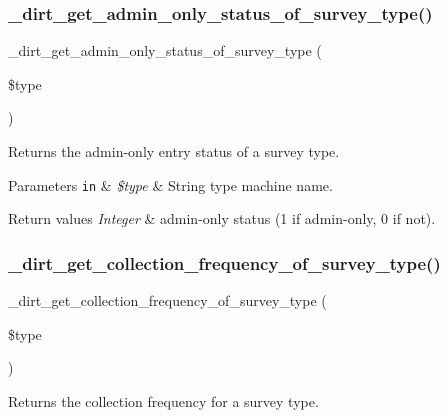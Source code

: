 \subsubsection{\texorpdfstring{\+\_\+dirt\+\_\+get\+\_\+admin\+\_\+only\+\_\+status\+\_\+of\+\_\+survey\+\_\+type()}{\_dirt\_get\_admin\_only\_status\_of\_survey\_type()}}
{\footnotesize\ttfamily \+\_\+dirt\+\_\+get\+\_\+admin\+\_\+only\+\_\+status\+\_\+of\+\_\+survey\+\_\+type (\begin{DoxyParamCaption}\item[{}]{\$type }\end{DoxyParamCaption})}

Returns the admin-\/only entry status of a survey type.


\begin{DoxyParams}[1]{Parameters}
\mbox{\tt in}  & {\em \$type} & String type machine name.\\
\hline
\end{DoxyParams}

\begin{DoxyRetVals}{Return values}
{\em Integer} & admin-\/only status (1 if admin-\/only, 0 if not). \\
\hline
\end{DoxyRetVals}
\mbox{\label{dirt_8survey__types_8inc_ad4046b68c0497c09450d0f6501afdd7e}} 
\subsubsection{\texorpdfstring{\+\_\+dirt\+\_\+get\+\_\+collection\+\_\+frequency\+\_\+of\+\_\+survey\+\_\+type()}{\_dirt\_get\_collection\_frequency\_of\_survey\_type()}}
{\footnotesize\ttfamily \+\_\+dirt\+\_\+get\+\_\+collection\+\_\+frequency\+\_\+of\+\_\+survey\+\_\+type (\begin{DoxyParamCaption}\item[{}]{\$type }\end{DoxyParamCaption})}

Returns the collection frequency for a survey type.


